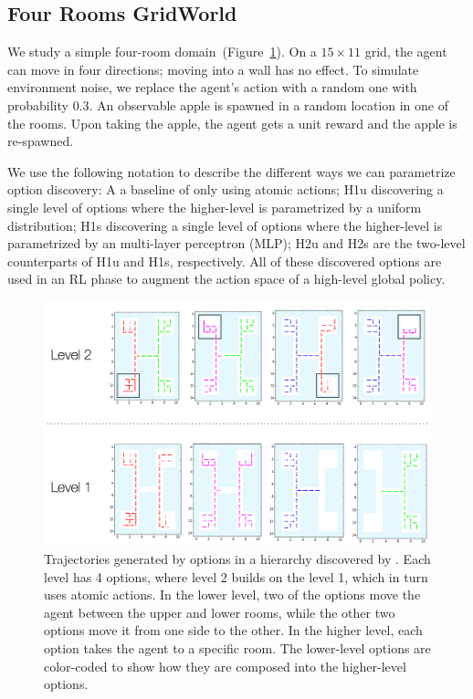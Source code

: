 \subsection*{Four Rooms GridWorld \label{exp:gw-four-rooms}}
We study a simple four-room domain~(Figure~\ref{gw-1}). On a $15\times11$ grid, the agent can move in four directions; moving into a wall has no effect. To simulate environment noise, we replace the agent's action with a random one with probability $0.3$. An observable apple is spawned in a random location in one of the rooms. Upon taking the apple, the agent gets a unit reward and the apple is re-spawned.

We use the following notation to describe the different ways we can parametrize option discovery: \textsf{A} a baseline of only using atomic actions; \textsf{H1u} discovering a single level of options where the higher-level is parametrized by a uniform distribution; \textsf{H1s} discovering a single level of options where the higher-level is parametrized by an multi-layer perceptron (MLP); \textsf{H2u} and \textsf{H2s} are the two-level counterparts of \textsf{H1u} and \textsf{H1s}, respectively. All of these discovered options are used in an RL phase to augment the action space of a high-level global policy.

\begin{figure}[ht!]
    \centering
    \includegraphics[width=\columnwidth]{ddco-experiments/ddo-4-rooms-results.png}
    \caption{Trajectories generated by options in a hierarchy discovered by \alg. Each level has 4 options, where level 2 builds on the level 1, which in turn uses atomic actions. In the lower level, two of the options move the agent between the upper and lower rooms, while the other two options move it from one side to the other. 
    In the higher level, each option takes the agent to a specific room. The lower-level options are color-coded to show how they are composed into the higher-level options. \label{gw-1}} 
\end{figure}

